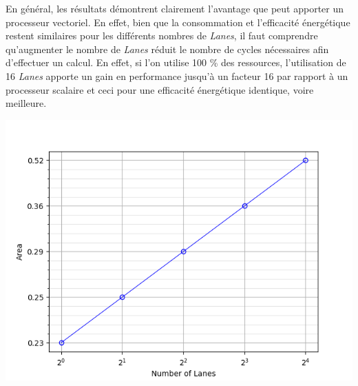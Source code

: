 \documentclass[11pt,letterpaper]{article}
\begin{document}
\begin{multicols}{2}
    En général, les résultats démontrent clairement l'avantage que peut apporter un processeur vectoriel. En effet,
    bien que la consommation et l'efficacité énergétique restent similaires pour les différents nombres de \textit{Lanes},
    il faut comprendre qu'augmenter le nombre de \textit{Lanes} réduit le nombre de cycles nécessaires afin d'effectuer 
    un calcul. En effet, si l’on utilise 100 \% des ressources, l'utilisation de 16 \textit{Lanes} apporte un gain en performance
    jusqu'à un facteur 16 par rapport à un processeur scalaire et ceci pour une efficacité énergétique identique, voire meilleure.
    
    {\centering
    \includegraphics[width=0.9\linewidth]{area.png}
    \captionsetup{hypcap=false}
    \label{fig:area}}
    \bigskip

    \end{multicols}
\end{document}
